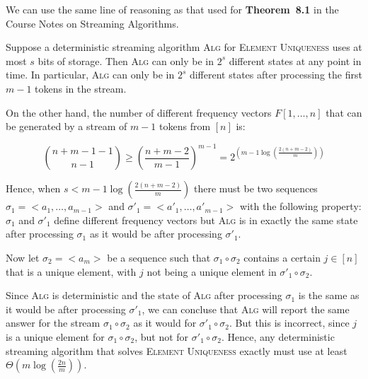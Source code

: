 We can use the same line of reasoning as that used for \textbf{Theorem~8.1} in the Course Notes on Streaming Algorithms.

Suppose a deterministic streaming algorithm \textsc{Alg} for \textsc{Element Uniqueness} uses at most $s$ bits of storage.
Then \textsc{Alg} can only be in $2^s$ different states at any point in time.
In particular, \textsc{Alg} can only be in $2^s$ different states after processing the first $m - 1$ tokens in the stream.

On the other hand, the number of different frequency vectors $F[1, \ldots, n]$ that can be generated by a stream of $m - 1$ tokens from $\left[n\right]$ is:

\[
	{n + m - 1 - 1 \choose n - 1} \geq \left(\frac{n + m - 2}{m - 1}\right)^{m - 1} = 2^{(m - 1\log\left(\frac{2\left(n+m - 2\right)}{m}\right))}
\]

Hence, when $s < m - 1\log\left(\frac{2\left(n + m - 2\right)}{m}\right)$ there must be two sequences $\sigma_1 = <a_1, \ldots, a_{m - 1}>$ and $\sigma'_1 = <a'_1, \ldots, a'_{m - 1}>$ with the following property:
$\sigma_1$ and $\sigma'_1$ define different frequency vectors but \textsc{Alg} is in exactly the same state after processing $\sigma_1$ as it would be after processing $\sigma'_1$.


Now let $\sigma_2 = <a_m>$ be a sequence such that $\sigma_1 \circ \sigma_2$ contains a certain $j \in \left[n\right]$ that is a unique element, with $j$ not being a unique element in $\sigma'_1 \circ \sigma_2$.

Since \textsc{Alg} is deterministic and the state of \textsc{Alg} after processing $\sigma_1$ is the same as it would be after processing $\sigma'_1$, we can concluse that \textsc{Alg} will report the same answer for the stream $\sigma_1 \circ \sigma_2$ as it would for $\sigma'_1 \circ \sigma_2$.
But this is incorrect, since $j$ is a unique element for $\sigma_1 \circ \sigma_2$, but not for $\sigma'_1 \circ \sigma_2$.
Hence, any deterministic streaming algorithm that solves \textsc{Element Uniqueness} exactly must use at least $\Theta\left(m \log\left(\frac{2n}{m}\right)\right)$.
